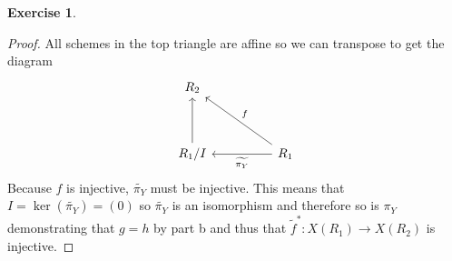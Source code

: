 \documentclass{article}
\theoremstyle{definition}
\newtheorem{question}{Exercise}
\begin{document}
\begin{question}
\begin{enumerate}[(i)]
\begin{proof}
                  All schemes in the top triangle are affine so we can transpose
                  to get the diagram
                  \[
                      \begin{tikzcd}[ampersand replacement=\&]
                          R_{2}\\
                          \\
                          R_{1}/I \&\& R_{1}
                          \arrow["f"', from=3-3, to=1-1]
                          \arrow["\widetilde{\pi_{Y}}", from=3-3, to=3-1]
                          \arrow[from=3-1, to=1-1]
                      \end{tikzcd}
                  \]
                  Because \(f\) is injective, \(\widetilde{\pi_{Y}}\) must be
                  injective. This means that \(I=\ker(\widetilde{\pi_{Y}})=(0)\)
                  so \(\widetilde{\pi_{Y}}\) is an isomorphism and therefore so
                  is \(\pi_{Y}\) demonstrating that \(g=h\) by part b and thus
                  that \(\tilde{f}^{*}:X(R_{1})\to X(R_{2})\) is injective.
              \end{proof}
    \end{enumerate}
\end{question}
\end{document}
